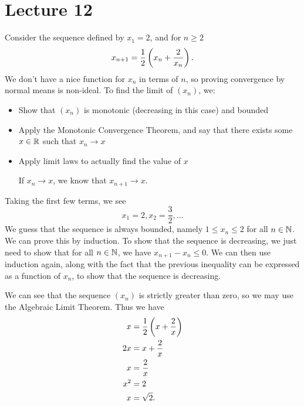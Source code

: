 \documentclass[class=article, crop=false]{standalone}
\begin{document}
  \section{Lecture 12}
  \begin{example}{}
    Consider the sequence defined by $x_1 = 2$, and for $n\geq 2$
    \[
      x_{n + 1} = \frac{1}{2}\left( x_n + \frac{2}{x_n} \right).
    \]
    We don't have a nice function for $x_n$ in terms of $n$, so proving convergence by normal means is non-ideal. To find the limit of $(x_n)$, we:
    \begin{itemize}
      \item Show that $(x_n)$ is monotonic (decreasing in this case) and bounded
      \item Apply the Monotonic Convergence Theorem, and say that there exists some $x\in\mathbb{R}$ such that $x_n\to x$
      \item Apply limit laws to actually find the value of $x$
      \begin{note}{}
        If $x_n\to x$, we know that $x_{n + 1}\to x$.
      \end{note}
    \end{itemize}
    Taking the first few terms, we see
    \[
      x_1 = 2, x_2 = \frac{3}{2}, \dotsc
    \]
    We guess that the sequence is always bounded, namely $1\leq x_n\leq 2$ for all $n\in\mathbb{N}$. We can prove this by induction. To show that the sequence is decreasing, we just need to show that for all $n\in\mathbb{N}$, we have $x_{n + 1} - x_n\leq 0$. We can then use induction again, along with the fact that the previous inequality can be expressed as a function of $x_n$, to show that the sequence is decreasing. \par
    We can see that the sequence $(x_n)$ is strictly greater than zero, so we may use the Algebraic Limit Theorem. Thus we have
    \begin{align*}
      x &= \frac{1}{2}\left( x + \frac{2}{x} \right) \\
      2x &= x + \frac{2}{x} \\
      x &= \frac{2}{x} \\
      x^2 &= 2 \\
      x &= \sqrt{2}.
    \end{align*}
  \end{example}
\end{document}
